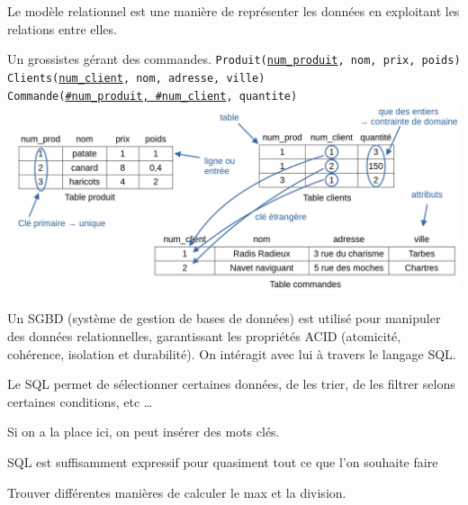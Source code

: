 \begin{definition}
	Le modèle relationnel est une manière de représenter les données en exploitant les relations entre elles.
\end{definition}

\begin{example}
	Un grossistes gérant des commandes.
	\texttt{Produit(\underline{num\_produit}, nom, prix, poids)}\\
	\texttt{Clients(\underline{num\_client}, nom, adresse, ville)}\\
	\texttt{Commande(\underline{\#num\_produit, \#num\_client}, quantite)}\\
	\includegraphics[width=\linewidth]{lecon/21-fichier/schema_bd.png}
\end{example}

\begin{definition}
	Un SGBD (système de gestion de bases de données) est utilisé pour manipuler des données relationnelles, garantissant les propriétés ACID (atomicité, cohérence, isolation et durabilité). On intéragit avec lui à travers le langage SQL.
\end{definition}

\begin{example}
	Le SQL permet de sélectionner certaines données, de les trier, de les filtrer selons certaines conditions, etc \dots
\end{example}

\begin{com}
	Si on a la place ici, on peut insérer des mots clés.
\end{com}

\begin{theorem}[Codd]
	SQL est suffisamment expressif pour quasiment tout ce que l'on souhaite faire
\end{theorem}

\begin{exercise}
	Trouver différentes manières de calculer le max et la division.
\end{exercise}

